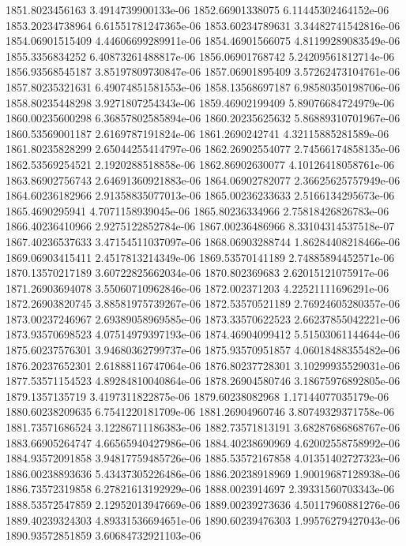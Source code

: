 {1851.8023456163 3.4914739900133e-06
1852.66901338075 6.11445302464152e-06
1853.20234738964 6.61551781247365e-06
1853.60234789631 3.34482741542816e-06
1854.06901515409 4.44606699289911e-06
1854.46901566075 4.81199289083549e-06
1855.3356834252 6.40873261488817e-06
1856.06901768742 5.24209561812714e-06
1856.93568545187 3.85197809730847e-06
1857.06901895409 3.57262473104761e-06
1857.80235321631 6.49074851581553e-06
1858.13568697187 6.98580350198706e-06
1858.80235448298 3.9271807254343e-06
1859.46902199409 5.89076684724979e-06
1860.00235600298 6.36857802585894e-06
1860.20235625632 5.86889310701967e-06
1860.53569001187 2.6169787191824e-06
1861.2690242741 4.32115885281589e-06
1861.80235828299 2.65044255414797e-06
1862.26902554077 2.74566174858135e-06
1862.53569254521 2.1920288518858e-06
1862.86902630077 4.10126418058761e-06
1863.86902756743 2.64691360921883e-06
1864.06902782077 2.36625625757949e-06
1864.60236182966 2.91358835077013e-06
1865.00236233633 2.5166134295673e-06
1865.4690295941 4.7071158939045e-06
1865.80236334966 2.75818426826783e-06
1866.40236410966 2.9275122852784e-06
1867.00236486966 8.33104314537518e-07
1867.40236537633 3.47154511037097e-06
1868.06903288744 1.86284408218466e-06
1869.06903415411 2.4517813214349e-06
1869.53570141189 2.74885894452571e-06
1870.13570217189 3.60722825662034e-06
1870.802369683 2.62015121075917e-06
1871.26903694078 3.55060710962846e-06
1872.002371203 4.22521111696291e-06
1872.26903820745 3.88581975739267e-06
1872.53570521189 2.76924605280357e-06
1873.00237246967 2.69389058969585e-06
1873.33570622523 2.66237855042221e-06
1873.93570698523 4.07514979397193e-06
1874.46904099412 5.51503061144644e-06
1875.60237576301 3.94680362799737e-06
1875.93570951857 4.06018488355482e-06
1876.20237652301 2.61888116747064e-06
1876.80237728301 3.10299935529031e-06
1877.53571154523 4.89284810040864e-06
1878.26904580746 3.18675976892805e-06
1879.1357135719 3.4197311822875e-06
1879.60238082968 1.17144077035179e-06
1880.60238209635 6.7541220181709e-06
1881.26904960746 3.80749329371758e-06
1881.73571686524 3.12286711186383e-06
1882.73571813191 3.68287686868767e-06
1883.66905264747 4.66565940427986e-06
1884.40238690969 4.62002558758992e-06
1884.93572091858 3.94817759485726e-06
1885.53572167858 4.01351402727323e-06
1886.00238893636 5.43437305226486e-06
1886.20238918969 1.90019687128938e-06
1886.73572319858 6.27821613192929e-06
1888.0023914697 2.39331560703343e-06
1888.53572547859 2.12952013947669e-06
1889.00239273636 4.50117960881276e-06
1889.40239324303 4.89331536694651e-06
1890.60239476303 1.99576279427043e-06
1890.93572851859 3.60684732921103e-06
}
